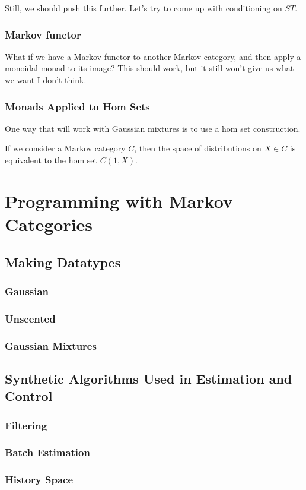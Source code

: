 Still, we should push this further. Let's try to come up with conditioning on $ST$.

\subsection{Markov functor}

What if we have a Markov functor to another Markov category, and then apply a monoidal monad to its image?
This should work, but it still won't give us what we want I don't think.

\subsection{Monads Applied to Hom Sets}

One way that will work with Gaussian mixtures is to use a hom set construction.

If we consider a Markov category $C$, then the space of distributions on $X\in C$ is equivalent to the hom set $C(1,X)$.

\chapter{Programming with Markov Categories}
\section{Making Datatypes}
\subsection{Gaussian}
\subsection{Unscented}
\subsection{Gaussian Mixtures}


\section{Synthetic Algorithms Used in Estimation and Control}
\subsection{Filtering}
\subsection{Batch Estimation}
\subsection{History Space}
